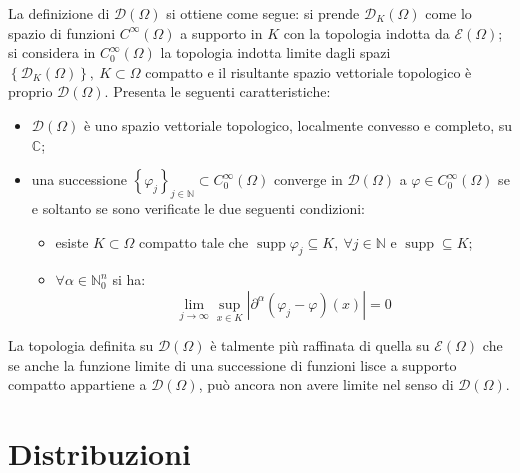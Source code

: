 \documentclass[10pt, a4paper]{scrartcl}
\theoremstyle{definition}
\numberwithin{esempio}{section}
\theoremstyle{definition}
\numberwithin{obs}{section}
\numberwithin{nota}{section}
\numberwithin{equation}{subsection}
\begin{document}
La definizione di $\mathcal{D}(\Omega )$ si ottiene come segue: si prende $\mathcal{D}_K(\Omega )$ come lo spazio di funzioni $C^\infty(\Omega )$ a supporto in $K$ con la topologia indotta da $\mathcal{E}(\Omega )$; si considera in $C_0^\infty(\Omega )$ la topologia indotta limite dagli spazi $\left\{ \mathcal{D}_K(\Omega ) \right\}, \ K\subset \Omega    $ compatto e il risultante spazio vettoriale topologico \`e proprio $\mathcal{D}(\Omega )$. Presenta le seguenti caratteristiche:
\begin{itemize}
	\item $\mathcal{D}(\Omega )$ \`e uno spazio vettoriale topologico, localmente convesso e completo, su $\mathbb{C}$;
	\item una successione $\left\{ \varphi _j \right\} _{j\in \mathbb{N}} \subset C_0^\infty(\Omega )$ converge in $\mathcal{D}(\Omega )$ a $\varphi \in C_0^{\infty} (\Omega )$ se e soltanto se sono verificate le due seguenti condizioni:
		\begin{itemize}
			\item esiste $K \subset \Omega $ compatto tale che $\operatorname{supp} \varphi _j \subseteq K, \ \forall j \in \mathbb{N}$ e $\operatorname{supp} \subseteq K$;
			\item $\forall \alpha \in \mathbb{N}_0^n$ si ha:
				\begin{equation}
				\lim_{j \to \infty} \sup_{x \in K} \left\lvert \partial ^\alpha (\varphi _j - \varphi ) (x)  \right\rvert =0 
				\end{equation}
		\end{itemize}
\end{itemize}
La topologia definita su $\mathcal{D}(\Omega )$ \`e talmente pi\`u raffinata di quella su $\mathcal{E}(\Omega )$ che se anche la funzione limite di una successione di funzioni lisce a supporto compatto appartiene a $\mathcal{D}(\Omega )$, pu\`o ancora non avere limite nel senso di $\mathcal{D}(\Omega )$.

\newpage
\section{Distribuzioni}
\end{document}
